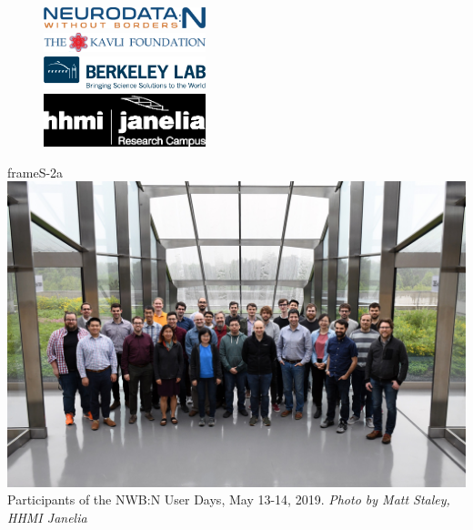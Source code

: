 \documentclass{article}
\begin{document}
\small


\tableofcontents

\begin{figure}[b!]
\vspace{0.3cm}
\includegraphics[width=0.42\textwidth,right]{figures/nwb_n_logo.png} \vspace{0.1cm} \\
\vspace{0.3cm}
\includegraphics[width=0.42\textwidth,right]{figures/kavli_logo.png} \\
\vspace{0.3cm}
\includegraphics[width=0.42\textwidth,right]{figures/lbnl_logo.jpg} \\
\includegraphics[width=0.42\textwidth,right]{figures/hhmi_logo.png}
\end{figure}


\clearpage


\begin{staticcontents*}{frameS-2a}
\includegraphics[width=\textwidth]{figures/user_days_group_photo_small.jpg}
Participants of the NWB:N User Days, May 13-14, 2019.
\small \textit{Photo by Matt Staley, HHMI Janelia}
\end{staticcontents*}
\end{document}
